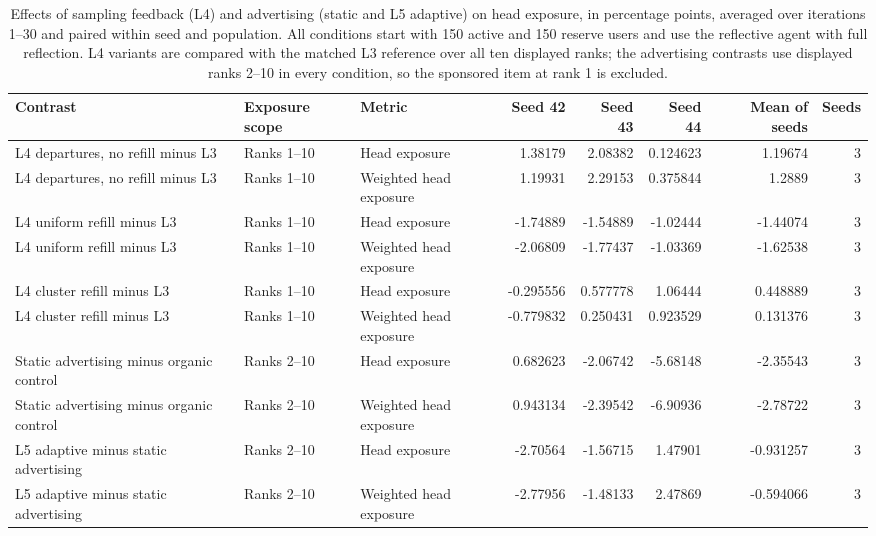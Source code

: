 \begin{table}[htbp!]
\centering
\small
\setlength{\tabcolsep}{3pt}
\renewcommand{\arraystretch}{1.1}
\begin{tabular}{lllrrrrr}
\hline
Contrast & Exposure scope & Metric & Seed 42 & Seed 43 & Seed 44 & Mean of seeds & Seeds \\
\hline
L4 departures, no refill minus L3 & Ranks 1–10 & Head exposure & 1.38179 & 2.08382 & 0.124623 & 1.19674 & 3 \\
L4 departures, no refill minus L3 & Ranks 1–10 & Weighted head exposure & 1.19931 & 2.29153 & 0.375844 & 1.2889 & 3 \\
L4 uniform refill minus L3 & Ranks 1–10 & Head exposure & -1.74889 & -1.54889 & -1.02444 & -1.44074 & 3 \\
L4 uniform refill minus L3 & Ranks 1–10 & Weighted head exposure & -2.06809 & -1.77437 & -1.03369 & -1.62538 & 3 \\
L4 cluster refill minus L3 & Ranks 1–10 & Head exposure & -0.295556 & 0.577778 & 1.06444 & 0.448889 & 3 \\
L4 cluster refill minus L3 & Ranks 1–10 & Weighted head exposure & -0.779832 & 0.250431 & 0.923529 & 0.131376 & 3 \\
Static advertising minus organic control & Ranks 2–10 & Head exposure & 0.682623 & -2.06742 & -5.68148 & -2.35543 & 3 \\
Static advertising minus organic control & Ranks 2–10 & Weighted head exposure & 0.943134 & -2.39542 & -6.90936 & -2.78722 & 3 \\
L5 adaptive minus static advertising & Ranks 2–10 & Head exposure & -2.70564 & -1.56715 & 1.47901 & -0.931257 & 3 \\
L5 adaptive minus static advertising & Ranks 2–10 & Weighted head exposure & -2.77956 & -1.48133 & 2.47869 & -0.594066 & 3 \\
\hline
\end{tabular}
\caption{Effects of sampling feedback (L4) and advertising (static and L5 adaptive) on head exposure, in percentage points, averaged over iterations 1--30 and paired within seed and population. All conditions start with 150 active and 150 reserve users and use the reflective agent with full reflection. L4 variants are compared with the matched L3 reference over all ten displayed ranks; the advertising contrasts use displayed ranks 2--10 in every condition, so the sponsored item at rank 1 is excluded.}
\label{chap:results:tab:main_rq1_l4_l5_effects}
\end{table}
